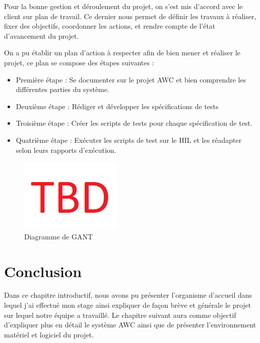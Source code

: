 Pour la bonne gestion et déroulement du projet, on s’est mis d’accord avec le client sur plan de travail. Ce dernier nous permet de définir les travaux à réaliser, fixer des objectifs, coordonner les actions, et rendre compte de l’état d’avancement du projet.

On a pu établir un plan d’action à respecter afin de bien mener et réaliser le projet, ce plan se compose des étapes suivantes : 

\begin{itemize}
	\item Première étape : Se documenter sur le projet AWC et bien comprendre les différentes parties du système.
	\item Deuxième étape : Rédiger et développer les spécifications de tests
	\item Troisième étape : Créer les scripts de tests pour chaque spécification de test.
	\item Quatrième étape : Exécuter les scripts de test sur le HIL et les réadapter selon leurs rapports d’exécution.
\end{itemize}

\begin{figure}[H]
 \centering
 \includegraphics[scale=0.7]{images/tbd}
 \caption{Diagramme de GANT}
\end{figure}

\section{Conclusion}
Dans ce chapitre introductif, nous avons pu présenter l’organisme d’accueil dans lequel j’ai effectué mon stage ainsi expliquer de façon brève et générale le projet sur lequel notre équipe a travaillé. Le chapitre suivant aura comme objectif d’expliquer plus en détail le système AWC ainsi que de présenter l’environnement matériel et logiciel du projet.

